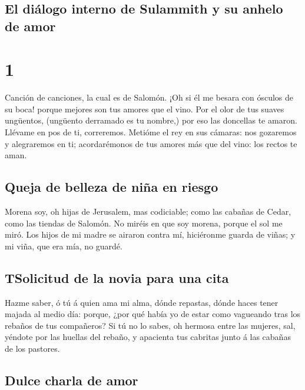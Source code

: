 \hypertarget{el-diuxe1logo-interno-de-sulammith-y-su-anhelo-de-amor}{%
\subsection{El diálogo interno de Sulammith y su anhelo de
amor}\label{el-diuxe1logo-interno-de-sulammith-y-su-anhelo-de-amor}}

\hypertarget{section}{%
\section{1}\label{section}}

 Canción de canciones, la cual es de Salomón.
 ¡Oh si él me besara con ósculos de su boca! porque
mejores son tus amores que el vino.  Por el olor de tus
suaves ungüentos, (ungüento derramado es tu nombre,) por eso las
doncellas te amaron.  Llévame en pos de ti, correremos.
Metióme el rey en sus cámaras: nos gozaremos y alegraremos en ti;
acordarémonos de tus amores más que del vino: los rectos te aman.

\hypertarget{queja-de-belleza-de-niuxf1a-en-riesgo}{%
\subsection{Queja de belleza de niña en
riesgo}\label{queja-de-belleza-de-niuxf1a-en-riesgo}}

 Morena soy, oh hijas de Jerusalem, mas codiciable; como
las cabañas de Cedar, como las tiendas de Salomón.  No
miréis en que soy morena, porque el sol me miró. Los hijos de mi madre
se airaron contra mí, hiciéronme guarda de viñas; y mi viña, que era
mía, no guardé.

\hypertarget{tsolicitud-de-la-novia-para-una-cita}{%
\subsection{TSolicitud de la novia para una
cita}\label{tsolicitud-de-la-novia-para-una-cita}}

 Hazme saber, ó tú á quien ama mi alma, dónde repastas,
dónde haces tener majada al medio día: porque, ¿por qué había yo de
estar como vagueando tras los rebaños de tus compañeros? 
Si tú no lo sabes, oh hermosa entre las mujeres, sal, yéndote por las
huellas del rebaño, y apacienta tus cabritas junto á las cabañas de los
pastores.

\hypertarget{dulce-charla-de-amor}{%
\subsection{Dulce charla de amor}\label{dulce-charla-de-amor}}


